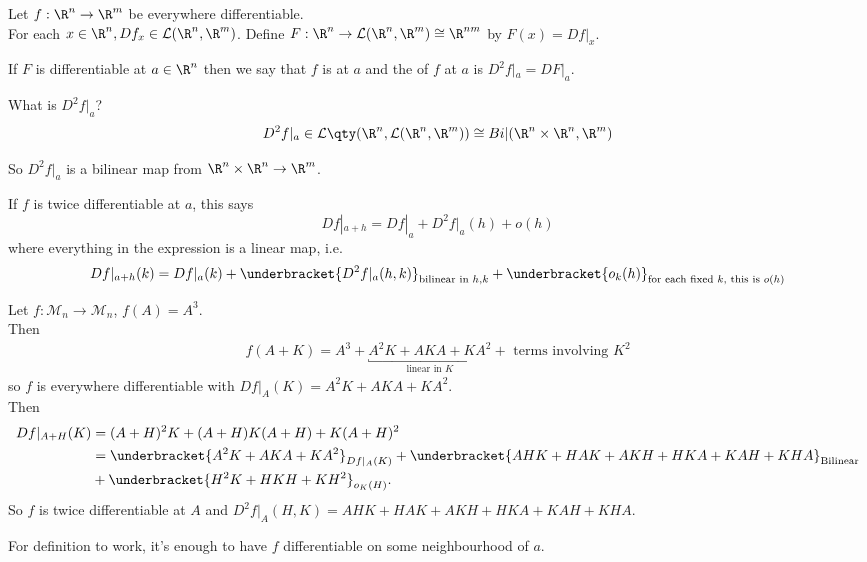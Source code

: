 \begin{definition}
Let $f:\R^n\to \R^m$ be everywhere differentiable. \\
For each $x\in \R^n, Df_x\in \mathcal{L}(\R^n,\R^m)$.
Define $F: \R^n\to\mathcal{L}(\R^n,\R^m) \cong \R^{nm}$ by $F(x) = Df|_x$.

If $F$ is differentiable at $a \in \R^n$ then we say that $f$ is  at $a$ and the  of $f$ at $a$ is $D^2f|_a = DF|_a$.
\end{definition}

What is $D^2 f|_a$?
\begin{align*}
    D^2f|_a\in \mathcal{L} \qty(\R^n, \mathcal{L}(\R^n,\R^m)) \cong Bi|(\R^n\times\R^n, \R^m)
\end{align*}

So $D^2f|_a$ is a bilinear map from $\R^n\times\R^n \to \R^m$.

If $f$ is twice differentiable at $a$, this says \[ Df|_{a+h} = Df|_a + D^2f|_a(h) + o(h) \]
where everything in the expression is a linear map, i.e. \begin{align*}
    Df|_{a+h}(k) = Df|_a(k) + \underbracket{D^2 f|_a(h,k)}_{\textup{bilinear in }h,k} + \underbracket{o_k(h)}_{\textup{for each fixed }k, \textup{ this is }o(h)}
\end{align*}

\begin{example}
    Let $f: \mathcal{M}_n\to\mathcal{M}_n$, $f(A) = A^3$. \\
    Then \begin{align*}
        f(A+K) = A^3 + \underbracket{A^2K + AKA + KA^2}_{\text{linear in }K} + \text{ terms involving $K^2$}
    \end{align*} so $f$ is everywhere differentiable with $Df|_A(K) =  A^2K + AKA + KA^2$. \\
    Then
    \begin{align*}
        Df|_{A+H}(K) &= (A+H)^2 K + (A+H)K(A+H) + K(A+H)^2 \\
        &= \underbracket{A^2K + AKA + KA^2}_{Df|_A(K)} + \underbracket{AHK+HAK+AKH+HKA+KAH+KHA}_{\textup{Bilinear}} \\
        &+ \underbracket{H^2K+HKH+KH^2}_{o_K(H)}.
    \end{align*}
    So $f$ is twice differentiable at $A$ and $D^2f|_A(H,K) = AHK+HAK+AKH+HKA+KAH+KHA$.
\end{example}

\begin{remark}
For definition to work, it's enough to have $f$ differentiable on some neighbourhood of $a$.
\end{remark}

